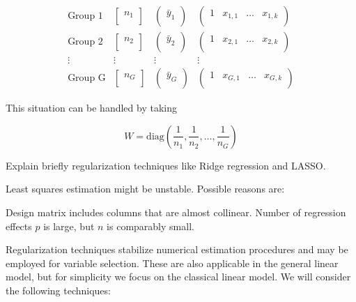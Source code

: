 \[
\begin{array}{cccc}
\text{Group 1} & \begin{bmatrix} n_1 \\ \end{bmatrix} & \begin{pmatrix} \bar{y}_1 \\ \end{pmatrix} & \begin{pmatrix} 1 & x_{1,1} & \dots & x_{1,k} \\ \end{pmatrix} \\
\text{Group 2} & \begin{bmatrix} n_2 \\ \end{bmatrix} & \begin{pmatrix} \bar{y}_2 \\ \end{pmatrix} & \begin{pmatrix} 1 & x_{2,1} & \dots & x_{2,k} \\ \end{pmatrix} \\
\vdots & \vdots & \vdots & \vdots \\
\text{Group G} & \begin{bmatrix} n_G \\ \end{bmatrix} & \begin{pmatrix} \bar{y}_G \\ \end{pmatrix} & \begin{pmatrix} 1 & x_{G,1} & \dots & x_{G,k} \\ \end{pmatrix}
\end{array}
\]

This situation can be handled by taking 

\[W = \text{diag} \left( \frac{1}{n_1}, \frac{1}{n_2}, \dots, \frac{1}{n_G} \right)\]



Explain briefly regularization techniques like Ridge regression and LASSO.

Least squares estimation might be unstable.
Possible reasons are:

Design matrix includes columns that are almost collinear.
Number of regression effects \(p\) is large, but \(n\) is comparably small.

Regularization techniques stabilize numerical estimation procedures and may be employed for variable selection.
These are also applicable in the general linear model, but for simplicity we focus on the classical linear model.
We will consider the following techniques:

